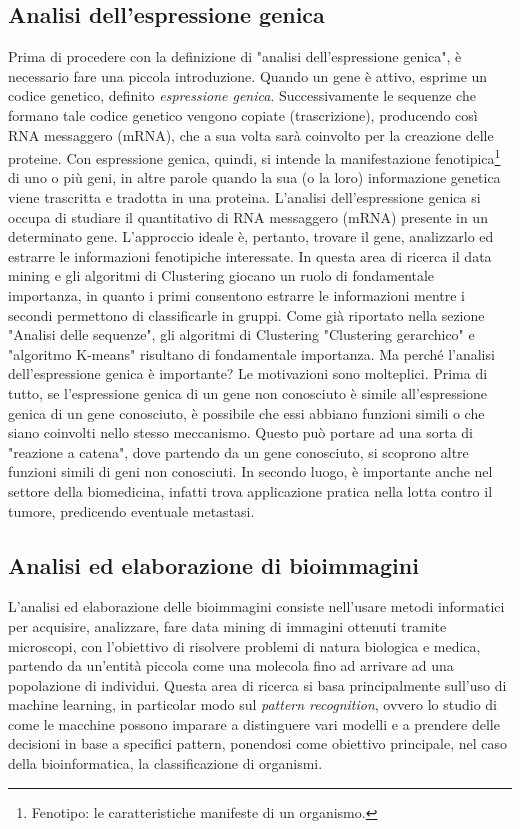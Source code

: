 \subsection{Analisi dell'espressione genica}
Prima di procedere con la definizione di "analisi dell'espressione genica", è necessario fare una piccola introduzione. Quando un gene è attivo, esprime un codice genetico, definito \textit{espressione genica}. Successivamente le sequenze che formano tale codice genetico vengono copiate (trascrizione), producendo così RNA messaggero (mRNA), che a sua volta sarà coinvolto per la creazione delle proteine.
\newline
Con espressione genica, quindi, si intende la manifestazione fenotipica\footnote{Fenotipo: le caratteristiche manifeste di un organismo.} di uno o più geni, in altre parole quando la sua (o la loro) informazione genetica viene trascritta e tradotta in una proteina.
\newline
L'analisi dell'espressione genica si occupa di studiare il quantitativo di RNA messaggero (mRNA) presente in un determinato gene.
L'approccio ideale è, pertanto, trovare il gene, analizzarlo ed estrarre le informazioni fenotipiche interessate.
\newline
In questa area di ricerca il data mining e gli algoritmi di Clustering giocano un ruolo di fondamentale importanza, in quanto i primi consentono estrarre le informazioni mentre i secondi permettono di classificarle in gruppi. Come già riportato nella sezione "Analisi delle sequenze", gli algoritmi di Clustering "Clustering gerarchico" e "algoritmo K-means" risultano di fondamentale importanza.
\newline
Ma perché l'analisi dell'espressione genica è importante? Le motivazioni sono molteplici. Prima di tutto, se l'espressione genica di un gene non conosciuto è simile all'espressione genica di un  gene conosciuto, è possibile che essi abbiano funzioni simili o che siano coinvolti nello stesso meccanismo. Questo può portare ad una sorta di "reazione a catena", dove partendo da un gene conosciuto, si scoprono altre funzioni simili di geni non conosciuti. In secondo luogo, è importante anche nel settore della biomedicina, infatti trova applicazione pratica nella lotta contro il tumore, predicendo eventuale metastasi.

\subsection{Analisi ed elaborazione di bioimmagini}
L'analisi ed elaborazione delle bioimmagini consiste nell'usare metodi informatici per acquisire, analizzare, fare data mining di immagini ottenuti tramite microscopi, con l'obiettivo di risolvere problemi di natura biologica e medica, partendo da un'entità piccola come una molecola fino ad arrivare ad una popolazione di individui.
Questa area di ricerca si basa principalmente sull'uso di machine learning, in particolar modo sul \textit{pattern recognition}, ovvero lo studio di come le macchine possono imparare a distinguere vari modelli e a prendere delle decisioni in base a specifici pattern, ponendosi come obiettivo principale, nel caso della bioinformatica, la classificazione di organismi.

